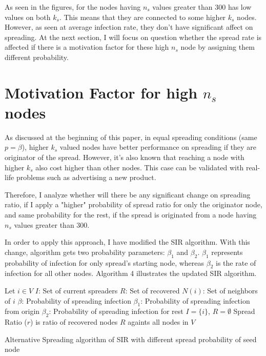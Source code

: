 \documentclass[11pt,a4,twocolumn]{article}
\begin{document}
As seen in the figures, for the nodes having  $n_{s}$ values greater than $300$ has low values on both $k_{s}$. This means that they are connected to some higher $k_{s}$ nodes. However, as seen at average infection rate, they don't have significant affect on spreading. At the next section, I will focus on question whether the spread rate is affected if there is a motivation factor for these high $n_{s}$ node by assigning them different probability.

\section{Motivation Factor for high $n_{s}$ nodes} 

As discussed at the beginning of this paper, in equal spreading conditions (same $p = \beta$), higher $k_{s}$ valued nodes have better performance on spreading if they are originator of the spread. However, it's also known that reaching a node with higher $k_{s}$ also cost higher than other nodes. This case can be validated with real-life problems such as advertising a new product.

 Therefore, I analyze whether will there be any significant change on spreading ratio, if I apply a "higher" probability of spread ratio for only the originator node, and same probability for the rest, if the spread is originated from a node having $n_{s}$ values greater than $300$.

In order to apply this approach, I have modified the SIR algorithm. With this change, algorithm gets two probability parameters: ${\beta}_{1}$ and ${\beta}_{2}$. ${\beta}_{1}$ represents probability of infection for only spread's starting node, whereas ${\beta}_{2}$ is the rate of infection for all other nodes. Algorithm 4 illustrates the updated SIR algorithm.

\begin{algorithm}
\SetAlgoLined
{}
Let $i \in V$\;
$I$: Set of current spreaders\;
$R$: Set of recovered\;
$N(i)$: Set of neighbors of $i$\;
$\beta$: Probability of spreading infection\;
${\beta}_{1}$: Probability of spreading infection from origin\;
${\beta}_{2}$: Probability of spreading infection for rest\;
$I = \{ i \}$,   $R = \emptyset$ \;
Spread Ratio ($r$) is ratio of recovered nodes $R$ againts all nodes in $V$ \;
 \caption{Alternative Spreading algorithm of SIR with different spread probability of seed node}
\end{algorithm}
\end{document}
